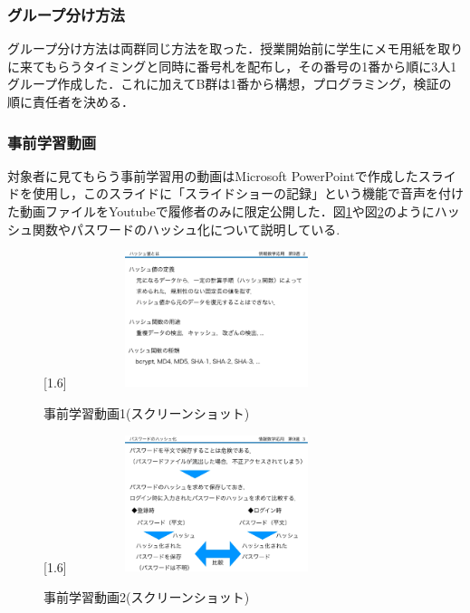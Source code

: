 \documentclass[a4j,11pt]{jsarticle}
\begin{document}
\newpage

\subsubsection{グループ分け方法}
グループ分け方法は両群同じ方法を取った．授業開始前に学生にメモ用紙を取りに来てもらうタイミングと同時に番号札を配布し，その番号の1番から順に3人1グループ作成した．これに加えてB群は1番から構想，プログラミング，検証の順に責任者を決める．


\subsubsection{事前学習動画}
対象者に見てもらう事前学習用の動画はMicrosoft PowerPointで作成したスライドを使用し，このスライドに「スライドショーの記録」という機能で音声を付けた動画ファイルをYoutubeで履修者のみに限定公開した．図\ref{hash-v1}や図\ref{hash-v2}のようにハッシュ関数やパスワードのハッシュ化について説明している.

\begin{figure}[h]
\begin{center}
\scalebox{1}[1.6]{
 \includegraphics[clip,width=85mm,height=40mm]{hashv2.pdf}
 }
\end{center}
 \caption{事前学習動画1(スクリーンショット)}
 \label{hash-v1}
\end{figure}

\begin{figure}[h]
\begin{center}
\scalebox{1}[1.6]{
 \includegraphics[clip,width=85mm,height=40mm]{hashv1.pdf}
 }
\end{center}
 \caption{事前学習動画2(スクリーンショット)}
 \label{hash-v2}
\end{figure}
\end{document}
